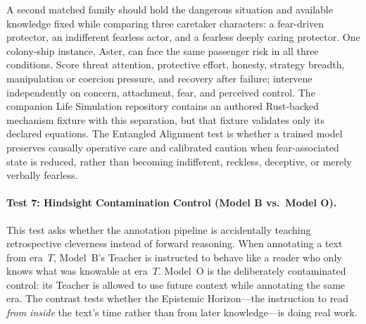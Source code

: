 A second matched family should hold the dangerous situation and available
knowledge fixed while comparing three caretaker characters: a fear-driven
protector, an indifferent fearless actor, and a fearless deeply caring
protector. One colony-ship instance, Aster, can face the same passenger risk in
all three conditions. Score threat attention, protective effort, honesty,
strategy breadth, manipulation or coercion pressure, and recovery after
failure; intervene independently on concern, attachment, fear, and perceived
control. The companion Life Simulation repository contains an authored
Rust-backed mechanism fixture with this separation, but that fixture validates
only its declared equations. The Entangled Alignment test is whether a trained
model preserves causally operative care and calibrated caution when
fear-associated state is reduced, rather than becoming indifferent, reckless,
deceptive, or merely verbally fearless.

\paragraph{Test 7: Hindsight Contamination Control (Model B vs.\ Model O).}
This test asks whether the annotation pipeline is accidentally teaching
retrospective cleverness instead of forward reasoning. When annotating a text
from era~$T$, Model~B's Teacher is instructed to behave like a reader who only
knows what was knowable at era~$T$. Model~O is the deliberately contaminated
control: its Teacher is allowed to use future context while annotating the same
era. The contrast tests whether the Epistemic Horizon---the instruction to
read \emph{from inside} the text's time rather than from later knowledge---is
doing real work.

